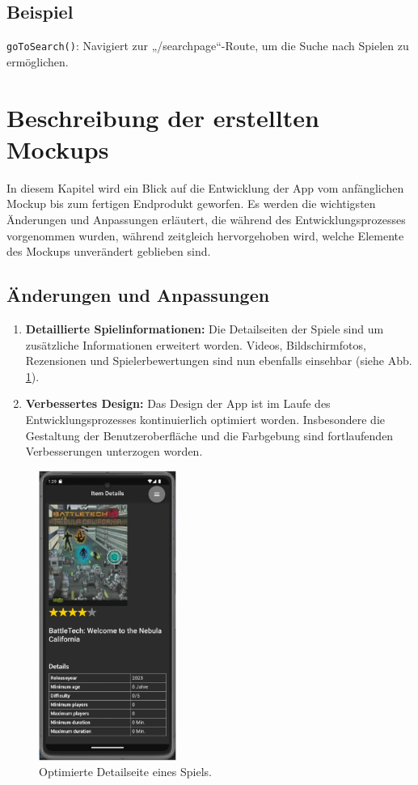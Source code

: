 \subsection{Beispiel}
\texttt{goToSearch()}: Navigiert zur „/searchpage“-Route, um die Suche nach Spielen zu ermöglichen.
\section{Beschreibung der erstellten Mockups}
In diesem Kapitel wird ein Blick auf die Entwicklung der App vom anfänglichen Mockup bis zum fertigen Endprodukt geworfen. Es werden die wichtigsten Änderungen und Anpassungen erläutert,
die während des Entwicklungsprozesses vorgenommen wurden, während zeitgleich hervorgehoben wird, welche Elemente des Mockups unverändert geblieben sind.
\subsection{Änderungen und Anpassungen}
\begin{enumerate}
    \item \textbf{Detaillierte Spielinformationen:} Die Detailseiten der Spiele sind um zusätzliche Informationen erweitert worden. Videos, Bildschirmfotos, Rezensionen und Spielerbewertungen sind nun ebenfalls einsehbar (siehe Abb. \ref{fig:detailseite}).
    \item \textbf{Verbessertes Design:} Das Design der App ist im Laufe des Entwicklungsprozesses kontinuierlich optimiert worden. Insbesondere die Gestaltung der Benutzeroberfläche und die Farbgebung sind fortlaufenden Verbesserungen unterzogen worden.
\end{enumerate}
\begin{figure}[H]
    \centering
    \includegraphics[width=0.4\textwidth]{graphics/infopage.png}
    \caption{Optimierte Detailseite eines Spiels.}
    \label{fig:detailseite}
\end{figure}
